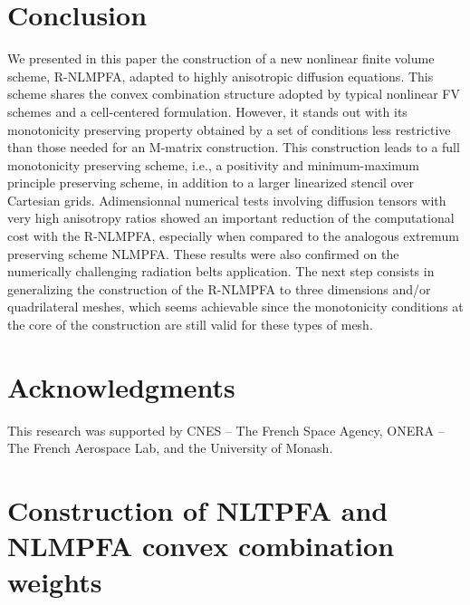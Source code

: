 \documentclass[final,11pt]{elsarticle}
\begin{document}
\section{Conclusion}\label{sec:conclusion}
We presented in this paper the construction of a new nonlinear finite volume scheme, R-NLMPFA, adapted to highly anisotropic diffusion equations. This scheme shares the convex combination structure adopted by typical nonlinear FV schemes and a cell-centered formulation. However, it stands out with its monotonicity preserving property obtained by a set of conditions less restrictive than those needed for an M-matrix construction. This construction leads to a full monotonicity preserving scheme, i.e., a positivity and minimum-maximum principle preserving scheme, in addition to a larger linearized stencil over Cartesian grids. Adimensionnal numerical tests involving diffusion tensors with very high anisotropy ratios showed an important reduction of the computational cost with the R-NLMPFA, especially when compared to the analogous extremum preserving scheme NLMPFA. These results were also confirmed on the numerically challenging radiation belts application. The next step consists in generalizing the construction of the R-NLMPFA to three dimensions and/or quadrilateral meshes, which seems achievable since the monotonicity conditions at the core of the construction are still valid for these types of mesh.

\section*{Acknowledgments}
This research was supported by CNES -- The French Space Agency, ONERA -- The French Aerospace Lab, and the University of Monash.

\appendix
\section{Construction of NLTPFA and NLMPFA convex combination weights}\label{sec:appenA}
\end{document}
